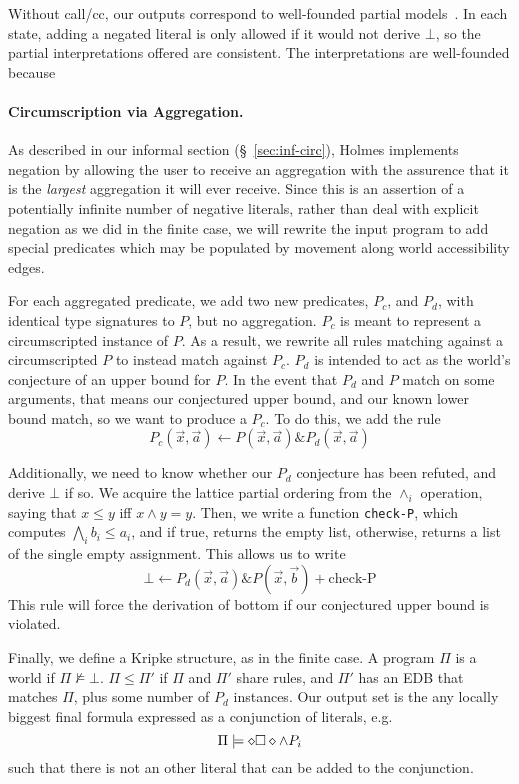 Without call/cc, our outputs correspond to well-founded partial models~\cite{wellfounded}.
In each state, adding a negated literal is only allowed if it would not derive $\bot$, so the partial interpretations offered are consistent.
The interpretations are well-founded because 

\paragraph{Circumscription via Aggregation.}
As described in our informal section (\S~\ref{sec:inf-circ}), Holmes implements negation by allowing the user to receive an aggregation with the assurence that it is the \emph{largest} aggregation it will ever receive.
Since this is an assertion of a potentially infinite number of negative literals, rather than deal with explicit negation as we did in the finite case, we will rewrite the input program to add special predicates which may be populated by movement along world accessibility edges.

For each aggregated predicate, we add two new predicates, $P_c$, and $P_d$, with identical type signatures to $P$, but no aggregation.
$P_c$ is meant to represent a circumscripted instance of $P$.
As a result, we rewrite all rules matching against a circumscripted $P$ to instead match against $P_c$.
$P_d$ is intended to act as the world's conjecture of an upper bound for $P$.
In the event that $P_d$ and $P$ match on some arguments, that means our conjectured upper bound, and our known lower bound match, so we want to produce a $P_c$.
To do this, we add the rule
\[
	P_c(\vec{x}, \vec{a}) \leftarrow P(\vec{x}, \vec{a}) \& P_d(\vec{x}, \vec{a})
\]

Additionally, we need to know whether our $P_d$ conjecture has been refuted, and derive $\bot$ if so.
We acquire the lattice partial ordering from the $\wedge_i$ operation, saying that $x \leq y$ iff $x \wedge y = y$.
Then, we write a function \texttt{check-P}, which computes $\bigwedge_i b_i \leq a_i$, and if true, returns the empty list, otherwise, returns a list of the single empty assignment.
This allows us to write
\[
	\bot \leftarrow P_d(\vec{x}, \vec{a}) \& P(\vec{x}, \vec{b}) + \textrm{check-P}
\]
This rule will force the derivation of bottom if our conjectured upper bound is violated.

Finally, we define a Kripke structure, as in the finite case.
A program $\Pi$ is a world if $\Pi \not \models \bot$.
$\Pi \leq \Pi'$ if $\Pi$ and $\Pi'$ share rules, and $\Pi'$ has an EDB that matches $\Pi$, plus some number of $P_d$ instances.
Our output set is the any locally biggest final formula expressed as a conjunction of literals, e.g.
\[
	\Pi \models \diamond \square \diamond \wedge P_i
\]
such that there is not an other literal that can be added to the conjunction.

